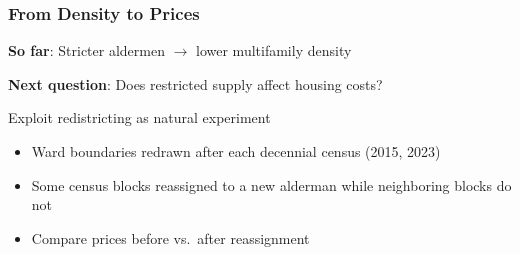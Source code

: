 
\begin{frame}
    \frametitle{From Density to Prices}
    
    \textbf{So far}: Stricter aldermen $\rightarrow$ lower multifamily density
    
    \vspace{0.5em}
    \textbf{Next question}: Does restricted supply affect housing costs?
    
    \vspace{0.5em}
    Exploit redistricting as natural experiment
    \begin{itemize}
        \item Ward boundaries redrawn after each decennial census (2015, 2023)
        \item Some census blocks reassigned to a new alderman while neighboring blocks do not
        \item Compare prices before vs.\ after reassignment
    \end{itemize}
\end{frame}


